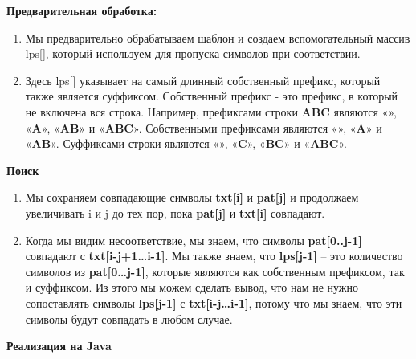 \textbf{Предварительная обработка:}
\begin{enumerate}
    \item Мы предварительно обрабатываем шаблон и создаем вспомогательный массив lps[], который используем для пропуска символов при соответствии. 
    \item Здесь lps[] указывает на самый длинный собственный префикс, который также является суффиксом. Собственный префикс - это префикс, в который не включена вся строка. Например, префиксами строки \textbf{ABC} являются «», «\textbf{A}», «\textbf{AB}» и «\textbf{ABC}». Собственными префиксами являются «», «\textbf{A}» и «\textbf{AB}». Суффиксами строки являются «», «\textbf{C}», «\textbf{BC}» и «\textbf{ABC}».
\end{enumerate}

\textbf{Поиск}
\begin{enumerate}
    \item Мы сохраняем совпадающие символы \textbf{txt[i]} и \textbf{pat[j]} и продолжаем увеличивать i и j до тех пор, пока \textbf{pat[j]} и \textbf{txt[i]} совпадают. 
    \item Когда мы видим несоответствие, мы знаем, что символы \textbf{pat[0..j-1]} совпадают с \textbf{txt[i-j+1…i-1]}. Мы также знаем, что \textbf{lps[j-1]} -- это количество символов из \textbf{pat[0…j-1]}, которые являются как собственным префиксом, так и суффиксом. Из этого мы можем сделать вывод, что нам не нужно сопоставлять символы \textbf{lps[j-1]} с \textbf{txt[i-j…i-1]}, потому что мы знаем, что эти символы будут совпадать в любом случае.
\end{enumerate}

\newpage
\textbf{Реализация на Java}

